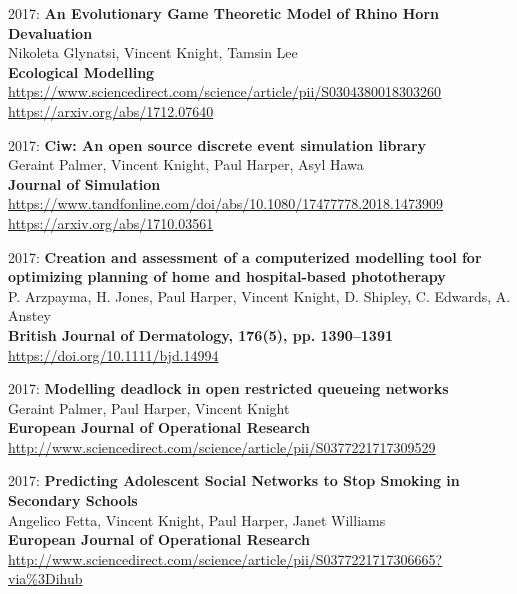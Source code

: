 \documentclass[10pt]{article}
\begin{document}
\begin{etaremune}
\item
  2017: \textbf{An Evolutionary Game Theoretic Model of Rhino Horn Devaluation}\\
  Nikoleta Glynatsi, Vincent Knight, Tamsin Lee\\
  \textbf{Ecological Modelling}\\
  \url{https://www.sciencedirect.com/science/article/pii/S0304380018303260}\\
  \url{https://arxiv.org/abs/1712.07640}\\

\item
  2017: \textbf{Ciw: An open source discrete event simulation library}\\
  Geraint Palmer, Vincent Knight, Paul Harper, Asyl Hawa\\
  \textbf{Journal of Simulation}\\
  \url{https://www.tandfonline.com/doi/abs/10.1080/17477778.2018.1473909}\\
  \url{https://arxiv.org/abs/1710.03561}\\

\item
  2017: \textbf{Creation and assessment of a computerized modelling tool for optimizing planning of home and hospital-based phototherapy}\\
  P. Arzpayma, H. Jones, Paul Harper, Vincent Knight, D. Shipley, C. Edwards, A. Anstey\\
  \textbf{British Journal of Dermatology, 176(5), pp. 1390--1391}\\
  \url{https://doi.org/10.1111/bjd.14994}\\
  

\item
  2017: \textbf{Modelling deadlock in open restricted queueing networks}\\
  Geraint Palmer, Paul Harper, Vincent Knight\\
  \textbf{European Journal of Operational Research}\\
  \url{http://www.sciencedirect.com/science/article/pii/S0377221717309529}\\
  

\item
  2017: \textbf{Predicting Adolescent Social Networks to Stop Smoking in Secondary Schools}\\
  Angelico Fetta, Vincent Knight, Paul Harper, Janet Williams\\
  \textbf{European Journal of Operational Research}\\
  \url{http://www.sciencedirect.com/science/article/pii/S0377221717306665?via%3Dihub}\\
  


\end{etaremune}
\end{document}
